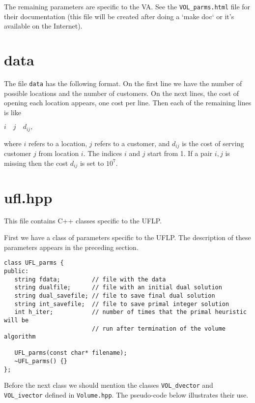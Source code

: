 \documentclass{article}
\begin{document}
The remaining parameters are specific to the VA. See the {\tt VOL\_parms.html}
file for their documentation (this file will be created after doing a `make
doc` or it's available on the Internet).

\section{data}

The file {\tt data} has the following format. On the first line we have the
number of possible locations and the number of customers. On the next lines,
the cost of opening each location appears, one cost per line. Then each of the
remaining lines is like

$
i \quad j \quad d_{ij},
$

\noindent where $i$ refers to a location, $j$ refers to a customer, and
$d_{ij}$ is the cost of serving customer $j$ from location $i$. The indices
$i$ and $j$ start from 1. If a pair $i,j$ is missing then the cost $d_{ij}$ is
set to $10^7$.


\section{ufl.hpp}

This file contains C++ classes specific to the UFLP.

First we have a class of parameters specific to the UFLP. The description
of these parameters appears in the preceding section.

\begin{verbatim}
class UFL_parms {
public:
   string fdata;         // file with the data
   string dualfile;      // file with an initial dual solution
   string dual_savefile; // file to save final dual solution
   string int_savefile;  // file to save primal integer solution
   int h_iter;           // number of times that the primal heuristic will be
                         // run after termination of the volume algorithm
   
   UFL_parms(const char* filename);
   ~UFL_parms() {}
};
\end{verbatim}

Before the next class we should mention the classes {\tt VOL\_dvector} and
{\tt VOL\_ivector} defined in {\tt Volume.hpp}. The pseudo-code below
illustrates their use. 
\end{document}
